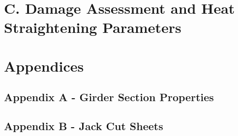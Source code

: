 \documentclass[11pt,letterpaper]{article}
\begin{document}
\section{C. Damage Assessment and Heat Straightening Parameters}
 


\setcounter{page}{1}
\renewcommand{\thepage}{ }

\section{Appendices}
\setcounter{page}{1}
\renewcommand{\thepage}{App. A.\arabic{page}}
\subsection{Appendix A - Girder Section Properties}
 


\setcounter{page}{1}
\renewcommand{\thepage}{App. B.\arabic{page}}
\subsection{Appendix B - Jack Cut Sheets}
 
\end{document}
